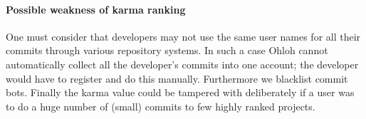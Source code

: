 \paragraph{Possible weakness of karma ranking}
One must consider that developers may not use the same user names for all their commits through various repository systems. In such a case Ohloh cannot automatically collect all the developer's commits into one account; the developer would have to register and do this manually. Furthermore we blacklist commit bots. Finally the karma value could be tampered with deliberately if a user was to do a huge number of (small) commits to few highly ranked projects.

%
%
%
%
